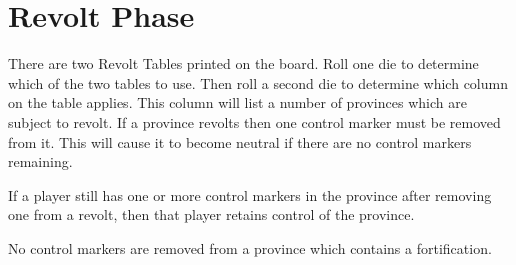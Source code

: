 \section{Revolt Phase}

There are two Revolt Tables printed on the board. Roll one die to determine which of the two tables to use. Then roll a second die to determine which column on the table applies. This column will list a number of provinces which are subject to revolt. If a province revolts then one control marker must be removed from it. This will cause it to become neutral if there are no control markers remaining.

If a player still has one or more control markers in the province after removing one from a revolt, then that player retains control of the province.

No control markers are removed from a province which contains a fortification.